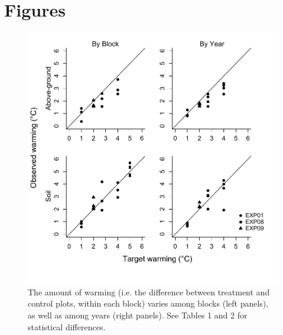 \documentclass{article}
\begin{document}


\clearpage
\section* {Figures}
 \begin{figure}[p]
     \centering
 \includegraphics{../figures/BothWarmingbyblockyear.pdf}    
 \caption{The amount of warming (i.e. the difference between treatment and control plots, within each block) varies among blocks (left panels), as well as among years (right panels). See Tables 1 and 2 for statistical differences.} %
 \end{figure}
\clearpage
\end{document}

